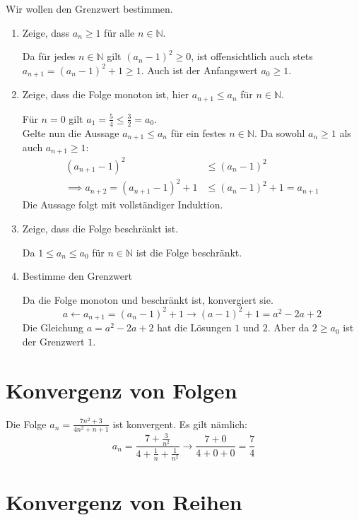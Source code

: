 \documentclass[10pt,a4paper]{article}
\begin{document}
\begin{multicols*}{2}
Wir wollen den Grenzwert bestimmen.\\

\begin{enumerate}[label=\alph*.]
	\item Zeige, dass $a_n\ge1$ für alle $n\in\mathbb{N}$.

		Da für jedes $n\in\mathbb{N}$ gilt $(a_n-1)^2\ge0$, ist offensichtlich auch stets $a_{n+1}=(a_n-1)^2+1 \ge 1$.
		Auch ist der Anfangswert $a_0\ge1$.

	\item Zeige, dass die Folge monoton ist, hier $a_{n+1}\le a_n$ für $n\in\mathbb{N}$.

		Für $n=0$ gilt $a_1=\frac{5}{4} \le \frac{3}{2}=a_0$.\\
		Gelte nun die Aussage $a_{n+1}\le a_n$ für ein festes $n\in\mathbb{N}$.
		Da sowohl $a_n\ge1$ als auch $a_{n+1}\ge1$:
		\begin{align*}
			(a_{n+1}-1)^2 &\le (a_n-1)^2 \\
			\implies a_{n+2}=(a_{n+1}-1)^2+1 &\le (a_n - 1)^2+1=a_{n+1}
		\end{align*}
		Die Aussage folgt mit vollständiger Induktion.

	\item Zeige, dass die Folge beschränkt ist.

		Da $1\le a_n \le a_0$ für $n\in\mathbb{N}$ ist die Folge beschränkt.

	\item Bestimme den Grenzwert

		Da die Folge monoton und beschränkt ist, konvergiert sie.\\
		\[a \longleftarrow a_{n+1}=(a_n-1)^2+1 \longrightarrow (a-1)^2+1=a^2-2a+2\]
		Die Gleichung $a=a^2-2a+2$ hat die Lösungen $1$ und $2$.
		Aber da $2\ge a_0$ ist der Grenzwert $1$.
\end{enumerate}

\vfill\null
\columnbreak

\section*{Konvergenz von Folgen}
Die Folge $a_n = \frac{7n^2+3}{4n^2+n+1}$ ist konvergent.
Es gilt nämlich:
\[a_n=\frac{7+\frac{3}{n^2}}{4+\frac{1}{n}+\frac{1}{n^2}}\to\frac{7+0}{4+0+0}=\frac{7}{4}\]

\section*{Konvergenz von Reihen}


\end{multicols*}
\end{document}
